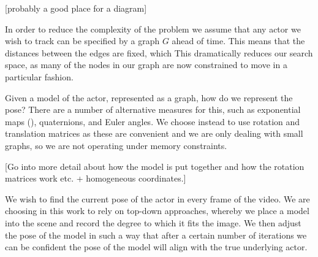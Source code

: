 [probably a good place for a diagram]

In order to reduce the complexity of the problem we assume that any actor we wish to track can be specified by a graph $G$ ahead of time. This means that the distances between the edges are fixed, which  This dramatically reduces our search space, as many of the nodes in our graph are now constrained to move in a particular fashion. 

Given a model of the actor, represented as a graph, how do we represent the pose? There are a number of alternative measures for this, such as exponential maps (), quaternions, and Euler angles. We choose instead to use rotation and translation matrices as these are convenient and we are only dealing with small graphs, so we are not operating under memory constraints. 

[Go into more detail about how the model is put together and how the rotation matrices work etc. + homogeneous coordinates.]

We wish to find the current pose of the actor in every frame of the video. We are choosing in this work to rely on top-down approaches, whereby we place a model into the scene and record the degree to which it fits the image. We then adjust the pose of the model in such a way that after a certain number of iterations we can be confident the pose of the model will align with the true underlying actor. 

